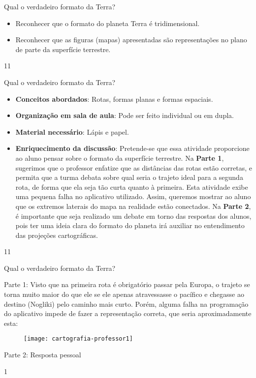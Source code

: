\clearmargin
\begin{objectives}{Qual o verdadeiro formato da Terra?}
{
	\begin{itemize}
	\item Reconhecer que o formato do planeta Terra é  tridimensional.
	\item Reconhecer que as figuras (mapas) apresentadas são representações no plano de parte da superfície terrestre.

	\end{itemize}
}{1}{1}
\end{objectives}
\begin{sugestions}{Qual o verdadeiro formato da Terra?}
{
	\begin{itemize}
	\item \textbf{Conceitos abordados}: Rotas, formas planas e formas espaciais.
	\item  \textbf{Organização em sala de aula}: Pode ser feito individual ou em dupla.
	\item \textbf{Material necessário}: Lápis e papel.
	\item \textbf{Enriquecimento da discussão}: Pretende-se que essa atividade  proporcione ao aluno pensar sobre o formato da superfície terrestre. Na \textbf{Parte 1}, sugerimos que o professor enfatize que as distâncias das rotas estão corretas, e permita que a turma debata sobre qual seria o trajeto ideal para a segunda rota, de forma que ela seja tão curta quanto à primeira.	Esta atividade exibe uma pequena falha no aplicativo utilizado. Assim, queremos mostrar ao aluno que os extremos laterais do mapa na realidade estão conectados. Na \textbf{Parte 2}, é importante que seja realizado um debate em torno das respostas dos alunos, pois  ter uma ideia clara do formato do planeta irá auxiliar no entendimento das projeções cartográficas.
	
	\end{itemize}
	
	
	
}{1}{1}
\end{sugestions}
\begin{answer}{Qual o verdadeiro formato da Terra?}
{Parte 1: Visto que na primeira rota é obrigatório passar pela Europa, o trajeto se torna muito maior do que ele se ele apenas atravessasse o pacífico e chegasse ao destino (Nogliki) pelo caminho mais curto. Porém, alguma falha na programação do aplicativo impede de fazer a representação correta, que seria aproximadamente esta:
	\begin{figure}[H]
	\centering
	
	\texttt{[image: cartografia-professor1]}
	\end{figure}

	Parte 2: Resposta pessoal
}{1}
\end{answer}
